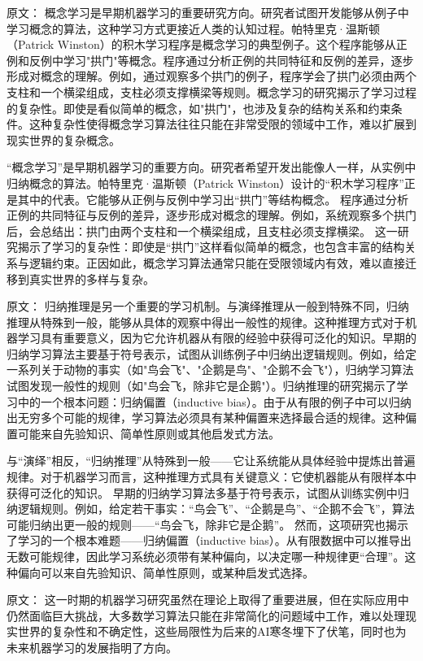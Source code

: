 原文：
概念学习是早期机器学习的重要研究方向。研究者试图开发能够从例子中学习概念的算法，这种学习方式更接近人类的认知过程。帕特里克·温斯顿（Patrick Winston）的积木学习程序是概念学习的典型例子。这个程序能够从正例和反例中学习"拱门"等概念。程序通过分析正例的共同特征和反例的差异，逐步形成对概念的理解。例如，通过观察多个拱门的例子，程序学会了拱门必须由两个支柱和一个横梁组成，支柱必须支撑横梁等规则。概念学习的研究揭示了学习过程的复杂性。即使是看似简单的概念，如"拱门"，也涉及复杂的结构关系和约束条件。这种复杂性使得概念学习算法往往只能在非常受限的领域中工作，难以扩展到现实世界的复杂概念。

“概念学习”是早期机器学习的重要方向。研究者希望开发出能像人一样，从实例中归纳概念的算法。帕特里克·温斯顿（Patrick Winston）设计的“积木学习程序”正是其中的代表。它能够从正例与反例中学习出“拱门”等结构概念。  
程序通过分析正例的共同特征与反例的差异，逐步形成对概念的理解。例如，系统观察多个拱门后，会总结出：拱门由两个支柱和一个横梁组成，且支柱必须支撑横梁。  
这一研究揭示了学习的复杂性：即使是“拱门”这样看似简单的概念，也包含丰富的结构关系与逻辑约束。正因如此，概念学习算法通常只能在受限领域内有效，难以直接迁移到真实世界的多样与复杂。

原文：
归纳推理是另一个重要的学习机制。与演绎推理从一般到特殊不同，归纳推理从特殊到一般，能够从具体的观察中得出一般性的规律。这种推理方式对于机器学习具有重要意义，因为它允许机器从有限的经验中获得可泛化的知识。早期的归纳学习算法主要基于符号表示，试图从训练例子中归纳出逻辑规则。例如，给定一系列关于动物的事实（如"鸟会飞"、"企鹅是鸟"、"企鹅不会飞"），归纳学习算法试图发现一般性的规则（如"鸟会飞，除非它是企鹅"）。归纳推理的研究揭示了学习中的一个根本问题：归纳偏置（inductive bias）。由于从有限的例子中可以归纳出无穷多个可能的规律，学习算法必须具有某种偏置来选择最合适的规律。这种偏置可能来自先验知识、简单性原则或其他启发式方法。

与“演绎”相反，“归纳推理”从特殊到一般——它让系统能从具体经验中提炼出普遍规律。对于机器学习而言，这种推理方式具有关键意义：它使机器能从有限样本中获得可泛化的知识。  
早期的归纳学习算法多基于符号表示，试图从训练实例中归纳逻辑规则。例如，给定若干事实：“鸟会飞”、“企鹅是鸟”、“企鹅不会飞”，算法可能归纳出更一般的规则——“鸟会飞，除非它是企鹅”。  
然而，这项研究也揭示了学习的一个根本难题——归纳偏置（inductive bias）。从有限数据中可以推导出无数可能规律，因此学习系统必须带有某种偏向，以决定哪一种规律更“合理”。这种偏向可以来自先验知识、简单性原则，或某种启发式选择。

原文：
这一时期的机器学习研究虽然在理论上取得了重要进展，但在实际应用中仍然面临巨大挑战，大多数学习算法只能在非常简化的问题域中工作，难以处理现实世界的复杂性和不确定性，这些局限性为后来的AI寒冬埋下了伏笔，同时也为未来机器学习的发展指明了方向。

